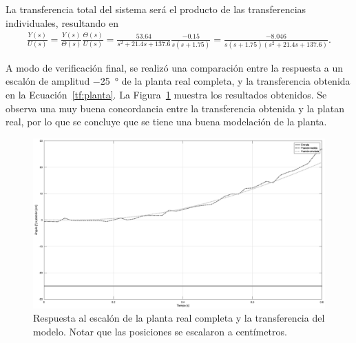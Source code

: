 La transferencia total del sistema será el producto de las transferencias individuales, resultando en
\begin{align}
    \label{tf:planta}
    \frac{Y(s)}{U(s)} = \frac{Y(s)}{\Theta(s)} \frac{\Theta(s)}{U(s)}
        = \frac{53.64}{s^2 + 21.4 s + 137.6} \frac{-0.15}{s(s+1.75)}
        = \frac{-8.046}{s (s+1.75) (s^2 + 21.4 s + 137.6)}.
\end{align}

A modo de verificación final, se realizó una comparación entre la respuesta a un escalón de amplitud \qty{-25}{\degree} de la planta real completa, y la transferencia obtenida en la Ecuación~\eqref{tf:planta}. La Figura~\ref{fig:step-planta} muestra los resultados obtenidos. Se observa una muy buena concordancia entre la transferencia obtenida y la platan real, por lo que se concluye que se tiene una buena modelación de la planta.

\begin{figure}[!htbp]
    \centering
    \includegraphics[width=\linewidth]{img/step-planta.eps}
    \caption{Respuesta al escalón de la planta real completa y la transferencia del modelo. Notar que las posiciones se escalaron a centímetros.}
    \label{fig:step-planta}
\end{figure}

